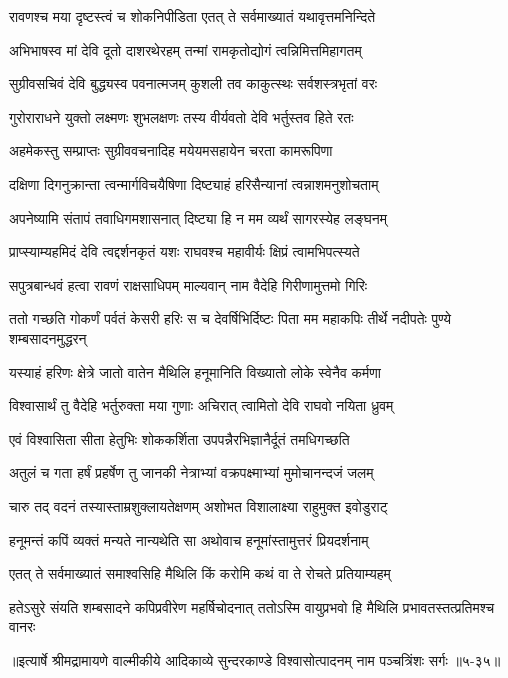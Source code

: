 \twolineshloka
{रावणश्च मया दृष्टस्त्वं च शोकनिपीडिता}
{एतत् ते सर्वमाख्यातं यथावृत्तमनिन्दिते} %

\twolineshloka
{अभिभाषस्व मां देवि दूतो दाशरथेरहम्}
{तन्मां रामकृतोद्योगं त्वन्निमित्तमिहागतम्} %

\twolineshloka
{सुग्रीवसचिवं देवि बुद्ध्यस्व पवनात्मजम्}
{कुशली तव काकुत्स्थः सर्वशस्त्रभृतां वरः} %

\twolineshloka
{गुरोराराधने युक्तो लक्ष्मणः शुभलक्षणः}
{तस्य वीर्यवतो देवि भर्तुस्तव हिते रतः} %

\twolineshloka
{अहमेकस्तु सम्प्राप्तः सुग्रीववचनादिह}
{मयेयमसहायेन चरता कामरूपिणा} %

\twolineshloka
{दक्षिणा दिगनुक्रान्ता त्वन्मार्गविचयैषिणा}
{दिष्ट्याहं हरिसैन्यानां त्वन्नाशमनुशोचताम्} %

\twolineshloka
{अपनेष्यामि संतापं तवाधिगमशासनात्}
{दिष्ट्या हि न मम व्यर्थं सागरस्येह लङ्घनम्} %

\twolineshloka
{प्राप्स्याम्यहमिदं देवि त्वद्दर्शनकृतं यशः}
{राघवश्च महावीर्यः क्षिप्रं त्वामभिपत्स्यते} %

\twolineshloka
{सपुत्रबान्धवं हत्वा रावणं राक्षसाधिपम्}
{माल्यवान् नाम वैदेहि गिरीणामुत्तमो गिरिः} %

\threelineshloka
{ततो गच्छति गोकर्णं पर्वतं केसरी हरिः}
{स च देवर्षिभिर्दिष्टः पिता मम महाकपिः}
{तीर्थे नदीपतेः पुण्ये शम्बसादनमुद्धरन्} %

\twolineshloka
{यस्याहं हरिणः क्षेत्रे जातो वातेन मैथिलि}
{हनूमानिति विख्यातो लोके स्वेनैव कर्मणा} %

\twolineshloka
{विश्वासार्थं तु वैदेहि भर्तुरुक्ता मया गुणाः}
{अचिरात् त्वामितो देवि राघवो नयिता ध्रुवम्} %

\twolineshloka
{एवं विश्वासिता सीता हेतुभिः शोककर्शिता}
{उपपन्नैरभिज्ञानैर्दूतं तमधिगच्छति} %

\twolineshloka
{अतुलं च गता हर्षं प्रहर्षेण तु जानकी}
{नेत्राभ्यां वक्रपक्ष्माभ्यां मुमोचानन्दजं जलम्} %

\twolineshloka
{चारु तद् वदनं तस्यास्ताम्रशुक्लायतेक्षणम्}
{अशोभत विशालाक्ष्या राहुमुक्त इवोडुराट्} %

\twolineshloka
{हनूमन्तं कपिं व्यक्तं मन्यते नान्यथेति सा}
{अथोवाच हनूमांस्तामुत्तरं प्रियदर्शनाम्} %

\twolineshloka
{एतत् ते सर्वमाख्यातं समाश्वसिहि मैथिलि}
{किं करोमि कथं वा ते रोचते प्रतियाम्यहम्} %

\twolineshloka
{हतेऽसुरे संयति शम्बसादने कपिप्रवीरेण महर्षिचोदनात्}
{ततोऽस्मि वायुप्रभवो हि मैथिलि प्रभावतस्तत्प्रतिमश्च वानरः} %


॥इत्यार्षे श्रीमद्रामायणे वाल्मीकीये आदिकाव्ये सुन्दरकाण्डे विश्वासोत्पादनम् नाम पञ्चत्रिंशः सर्गः ॥५-३५॥
